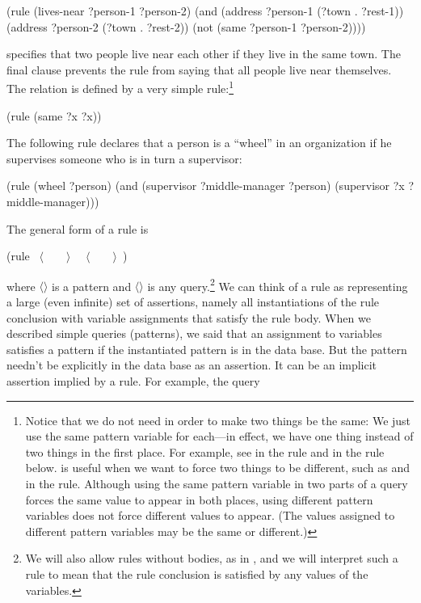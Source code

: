 \begin{codeBlock}
(rule (lives-near ?person-1 ?person-2)
      (and (address ?person-1 (?town . ?rest-1))
           (address ?person-2 (?town . ?rest-2))
           (not (same ?person-1 ?person-2))))
\end{codeBlock}

\noindent
specifies that two people live near each other if they live in the same town.
The final  clause prevents the rule from saying that all people live
near themselves.  The  relation is defined by a very simple
rule:\footnote{Notice that we do not need  in order to make two
things be the same: We just use the same pattern variable for each---in effect,
we have one thing instead of two things in the first place.  For example, see
 in the  rule and  in the
 rule below.   is useful when we want to force two
things to be different, such as  and  in the
 rule.  Although using the same pattern variable in two parts
of a query forces the same value to appear in both places, using different
pattern variables does not force different values to appear.  (The values
assigned to different pattern variables may be the same or different.)}

\begin{codeBlock}
(rule (same ?x ?x))
\end{codeBlock}

\noindent
The following rule declares that a person is a ``wheel'' in an organization if
he supervises someone who is in turn a supervisor:

\begin{codeBlock}
(rule (wheel ?person)
      (and (supervisor ?middle-manager ?person)
           (supervisor ?x ?middle-manager)))
\end{codeBlock}

\noindent
The general form of a rule is

\begin{codeBlock}
(rule ~\(\langle \)~~~~\(\rangle \)~ ~\(\langle \)~~~~\(\rangle \)~)
\end{codeBlock}

\noindent
where \( \langle \)\( \rangle \) is a pattern and \( \langle \)\( \rangle \) is any
query.\footnote{We will also allow rules without bodies, as in , and
we will interpret such a rule to mean that the rule conclusion is satisfied by
any values of the variables.} We can think of a rule as representing a large
(even infinite) set of assertions, namely all instantiations of the rule
conclusion with variable assignments that satisfy the rule body.  When we
described simple queries (patterns), we said that an assignment to variables
satisfies a pattern if the instantiated pattern is in the data base.  But the
pattern needn't be explicitly in the data base as an assertion.  It can be an
implicit assertion implied by a rule.  For example, the query

